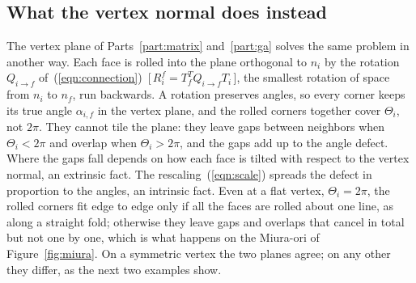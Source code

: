 \subsection{What the vertex normal does instead}

The vertex plane of Parts~\ref{part:matrix} and~\ref{part:ga} solves the same problem in another way. Each face is rolled into the plane orthogonal to $n_i$ by the rotation $Q_{i \to f}$ of~(\ref{eqn:connection})~[\,$R_i^f = T_f^TQ_{i\to f}T_i$\,], the smallest rotation of space from $n_i$ to $n_f$, run backwards. A rotation preserves angles, so every corner keeps its true angle $\alpha_{i,f}$ in the vertex plane, and the rolled corners together cover $\Theta_i$, not $2\pi$. They cannot tile the plane: they leave gaps between neighbors when $\Theta_i < 2\pi$ and overlap when $\Theta_i > 2\pi$, and the gaps add up to the angle defect. Where the gaps fall depends on how each face is tilted with respect to the vertex normal, an extrinsic fact. The rescaling~(\ref{eqn:scale}) spreads the defect in proportion to the angles, an intrinsic fact. Even at a flat vertex, $\Theta_i = 2\pi$, the rolled corners fit edge to edge only if all the faces are rolled about one line, as along a straight fold; otherwise they leave gaps and overlaps that cancel in total but not one by one, which is what happens on the Miura-ori of Figure~\ref{fig:miura}. On a symmetric vertex the two planes agree; on any other they differ, as the next two examples show.

